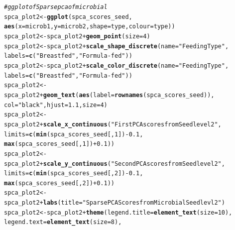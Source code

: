 \documentclass[12pt]{article}\usepackage[]{graphicx}\usepackage[]{color}
\makeatletter
\newcommand{\hlnum}[1]{\textcolor[rgb]{0.686,0.059,0.569}{#1}}%
\newcommand{\hlstr}[1]{\textcolor[rgb]{0.192,0.494,0.8}{#1}}%
\newcommand{\hlcom}[1]{\textcolor[rgb]{0.678,0.584,0.686}{\textit{#1}}}%
\newcommand{\hlopt}[1]{\textcolor[rgb]{0,0,0}{#1}}%
\newcommand{\hlstd}[1]{\textcolor[rgb]{0.345,0.345,0.345}{#1}}%
\newcommand{\hlkwb}[1]{\textcolor[rgb]{0.69,0.353,0.396}{#1}}%
\newcommand{\hlkwc}[1]{\textcolor[rgb]{0.333,0.667,0.333}{#1}}%
\newcommand{\hlkwd}[1]{\textcolor[rgb]{0.737,0.353,0.396}{\textbf{#1}}}%
\newenvironment{kframe}{%
 \def\at@end@of@kframe{}%
 \ifinner\ifhmode%
  \def\at@end@of@kframe{\end{minipage}}%
  \begin{minipage}{\columnwidth}%
 \fi\fi%
 \def\FrameCommand##1{\hskip\@totalleftmargin \hskip-\fboxsep
 \colorbox{shadecolor}{##1}\hskip-\fboxsep
     \hskip-\linewidth \hskip-\@totalleftmargin \hskip\columnwidth}%
 \MakeFramed {\advance\hsize-\width
   \@totalleftmargin\z@ \linewidth\hsize
   \@setminipage}}%
 {\par\unskip\endMakeFramed%
 \at@end@of@kframe}
\newenvironment{knitrout}{}{} %
\makeatother
\begin{document}
\begin{knitrout}
\begin{kframe}
\begin{alltt}
\hlcom{#ggplot of Sparse pca of microbial}
\hlstd{spca_plot2}\hlkwb{<-}\hlkwd{ggplot}\hlstd{(spca_scores_seed,}
                   \hlkwd{aes}\hlstd{(}\hlkwc{x}\hlstd{=microb1,}\hlkwc{y}\hlstd{=microb2,}\hlkwc{shape}\hlstd{=type,}\hlkwc{colour}\hlstd{=type))}
\hlstd{spca_plot2}\hlkwb{<-}\hlstd{spca_plot2}\hlopt{+}\hlkwd{geom_point}\hlstd{(}\hlkwc{size}\hlstd{=}\hlnum{4}\hlstd{)}
\hlstd{spca_plot2}\hlkwb{<-}\hlstd{spca_plot2}\hlopt{+}\hlkwd{scale_shape_discrete}\hlstd{(}\hlkwc{name}\hlstd{=}\hlstr{"Feeding Type"}\hlstd{,}
                                            \hlkwc{labels}\hlstd{=}\hlkwd{c}\hlstd{(}\hlstr{"Breastfed"}\hlstd{,}\hlstr{"Formula-fed"}\hlstd{))}
\hlstd{spca_plot2}\hlkwb{<-}\hlstd{spca_plot2}\hlopt{+}\hlkwd{scale_color_discrete}\hlstd{(}\hlkwc{name}\hlstd{=}\hlstr{"Feeding Type"}\hlstd{,}
                                            \hlkwc{labels}\hlstd{=}\hlkwd{c}\hlstd{(}\hlstr{"Breastfed"}\hlstd{,}\hlstr{"Formula-fed"}\hlstd{))}
\hlstd{spca_plot2}\hlkwb{<-}\hlstd{spca_plot2}\hlopt{+}\hlkwd{geom_text}\hlstd{(}\hlkwd{aes}\hlstd{(}\hlkwc{label}\hlstd{=}\hlkwd{rownames}\hlstd{(spca_scores_seed)),}
                                 \hlkwc{col}\hlstd{=}\hlstr{"black"}\hlstd{,}\hlkwc{hjust}\hlstd{=}\hlnum{1.1}\hlstd{,}\hlkwc{size}\hlstd{=}\hlnum{4}\hlstd{)}
\hlstd{spca_plot2}\hlkwb{<-}\hlstd{spca_plot2}\hlopt{+}\hlkwd{scale_x_continuous}\hlstd{(}\hlstr{"First PCA scores from Seedlevel2"}\hlstd{,}
                                          \hlkwc{limits}\hlstd{=}\hlkwd{c}\hlstd{(}\hlkwd{min}\hlstd{(spca_scores_seed[,}\hlnum{1}\hlstd{])}\hlopt{-}\hlnum{0.1}\hlstd{,}
                                                   \hlkwd{max}\hlstd{(spca_scores_seed[,}\hlnum{1}\hlstd{])}\hlopt{+}\hlnum{0.1}\hlstd{))}
\hlstd{spca_plot2}\hlkwb{<-}\hlstd{spca_plot2}\hlopt{+}\hlkwd{scale_y_continuous}\hlstd{(}\hlstr{"Second PCA scores from Seedlevel2"}\hlstd{,}
                                          \hlkwc{limits}\hlstd{=}\hlkwd{c}\hlstd{(}\hlkwd{min}\hlstd{(spca_scores_seed[,}\hlnum{2}\hlstd{])}\hlopt{-}\hlnum{0.1}\hlstd{,}
                                                   \hlkwd{max}\hlstd{(spca_scores_seed[,}\hlnum{2}\hlstd{])}\hlopt{+}\hlnum{0.1}\hlstd{))}
\hlstd{spca_plot2}\hlkwb{<-}\hlstd{spca_plot2}\hlopt{+}\hlkwd{labs}\hlstd{(}\hlkwc{title}\hlstd{=}\hlstr{"Sparse PCA Scores from Microbial Seedlevl2"}\hlstd{)}
\hlstd{spca_plot2}\hlkwb{<-}\hlstd{spca_plot2}\hlopt{+}\hlkwd{theme}\hlstd{(}\hlkwc{legend.title}\hlstd{=}\hlkwd{element_text}\hlstd{(}\hlkwc{size}\hlstd{=}\hlnum{10}\hlstd{),}
                             \hlkwc{legend.text}\hlstd{=}\hlkwd{element_text}\hlstd{(}\hlkwc{size}\hlstd{=}\hlnum{8}\hlstd{),}

\end{alltt}
\end{kframe}
\end{knitrout}
\end{document}
